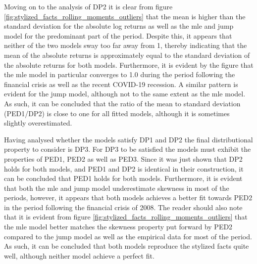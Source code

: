 Moving on to the analysis of DP2 it is clear from figure \ref{fig:stylized_facts_rolling_moments_outliers} that the mean is higher than the standard deviation for the absolute log returns as well as the mle and jump model for the predominant part of the period. Despite this, it appears that neither of the two models sway too far away from 1, thereby indicating that the mean of the absolute returns is approximately equal to the standard deviation of the absolute returns for both models. Furthermore, it is evident by the figure that the mle model in particular converges to 1.0 during the period following the financial crisis as well as the recent COVID-19 recession. A similar pattern is evident for the jump model, although not to the same extent as the mle model. As such, it can be concluded that the ratio of the mean to standard deviation (PED1/DP2) is close to one for all fitted models, although it is sometimes slightly overestimated.

Having analysed whether the models satisfy DP1 and DP2 the final distributional property to consider is DP3. For DP3 to be satisfied the models must exhibit the properties of PED1, PED2 as well as PED3. Since it was just shown that DP2 holds for both models, and PED1 and DP2 is identical in their construction, it can be concluded that PED1 holds for both models. Furthermore, it is evident that both the mle and jump model underestimate skewness in most of the periods, however, it appears that both models achieves a better fit towards PED2 in the period following the financial crisis of 2008. The reader should also note that it is evident from figure \ref{fig:stylized_facts_rolling_moments_outliers} that the mle model better matches the skewness property put forward by PED2 compared to the jump model as well as the empirical data for most of the period. As such, it can be concluded that both models reproduce the stylized facts quite well, although neither model achieve a perfect fit. 

